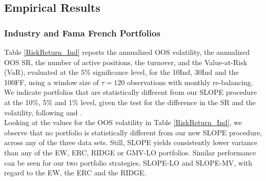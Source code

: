 \documentclass[12pt, a4paper]{article}
\begin{document}
\subsection{Empirical Results} %
\subsubsection*{Industry and Fama French Portfolios}
Table \ref{RiskReturn_Ind} reports the annualized OOS volatility, the annualized OOS SR, the number of active positions, the turnover, and the Value-at-Risk (VaR), evaluated at the 5\% significance level, for the 10Ind, 30Ind and the 100FF, using a window size of $\tau = 120$ observations with monthly re-balancing. We indicate portfolios that are statistically different from our SLOPE procedure at the 10\%, 5\% and 1\% level, given the test for the difference in the SR and the volatility, following \cite{Ledoit2008} and \cite{Ledoit2011}.\\
Looking at the values for the OOS volatility in Table \ref{RiskReturn_Ind}, we observe that no portfolio is statistically different from our new SLOPE procedure, across any of the three data sets. Still, SLOPE yields consistently lower variance than any of the EW, ERC, RIDGE or GMV-LO portfolios. Similar performance can be seen for our two portfolio strategies, SLOPE-LO and SLOPE-MV, with regard to the EW, the ERC and the RIDGE. 
\end{document}
